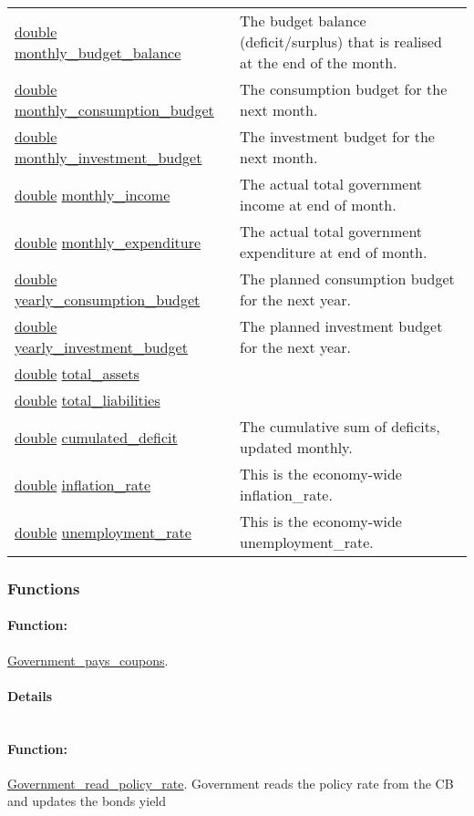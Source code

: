 \documentclass[a4paper,11pt]{article}
\begin{document}
\begin{center}
\begin{longtable}[H!]{ll}
\url{double} \url{monthly_budget_balance} & \parbox{10cm}{The budget balance (deficit/surplus) that is realised at the end of the month.} \\
\url{double} \url{monthly_consumption_budget} & \parbox{10cm}{The consumption budget for the next month.} \\
\url{double} \url{monthly_investment_budget} & \parbox{10cm}{The investment budget for the next month.} \\
\url{double} \url{monthly_income} & \parbox{10cm}{The actual total government income at end of month.} \\
\url{double} \url{monthly_expenditure} & \parbox{10cm}{The actual total government expenditure at end of month.} \\
\url{double} \url{yearly_consumption_budget} & \parbox{10cm}{The planned consumption budget for the next year.} \\
\url{double} \url{yearly_investment_budget} & \parbox{10cm}{The planned investment budget for the next year.} \\
\url{double} \url{total_assets} & \parbox{10cm}{} \\
\url{double} \url{total_liabilities} & \parbox{10cm}{} \\
\url{double} \url{cumulated_deficit} & \parbox{10cm}{The cumulative sum of deficits, updated monthly.} \\
\url{double} \url{inflation_rate} & \parbox{10cm}{This is the economy-wide inflation\_rate.} \\
\url{double} \url{unemployment_rate} & \parbox{10cm}{This is the economy-wide unemployment\_rate.} \\
\end{longtable}
\end{center}
\subsubsection{Functions}
\paragraph{Function:}\url{Government_pays_coupons}.

\paragraph{Details}
\begin{verbatim}
\end{verbatim}
\paragraph{Function:}\url{Government_read_policy_rate}.
Government reads the policy rate from the CB and updates the bonds yield
\end{document}
